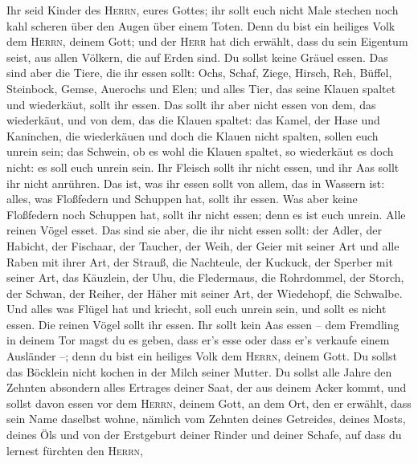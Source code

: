  Ihr seid Kinder des \textsc{Herrn}, eures Gottes; ihr
sollt euch nicht Male stechen noch kahl scheren über den Augen über
einem Toten.  Denn du bist ein heiliges Volk dem
\textsc{Herrn}, deinem Gott; und der \textsc{Herr} hat dich erwählt,
dass du sein Eigentum seist, aus allen Völkern, die auf Erden sind.
 Du sollst keine Gräuel essen.  Das sind
aber die Tiere, die ihr essen sollt: Ochs, Schaf, Ziege, 
Hirsch, Reh, Büffel, Steinbock, Gemse, Auerochs und Elen; 
und alles Tier, das seine Klauen spaltet und wiederkäut, sollt ihr
essen.  Das sollt ihr aber nicht essen von dem, das
wiederkäut, und von dem, das die Klauen spaltet: das Kamel, der Hase und
Kaninchen, die wiederkäuen und doch die Klauen nicht spalten, sollen
euch unrein sein;  das Schwein, ob es wohl die Klauen
spaltet, so wiederkäut es doch nicht: es soll euch unrein sein. Ihr
Fleisch sollt ihr nicht essen, und ihr Aas sollt ihr nicht anrühren.
 Das ist, was ihr essen sollt von allem, das in Wassern
ist: alles, was Floßfedern und Schuppen hat, sollt ihr essen.
 Was aber keine Floßfedern noch Schuppen hat, sollt ihr
nicht essen; denn es ist euch unrein.  Alle reinen Vögel
esset.  Das sind sie aber, die ihr nicht essen sollt: der
Adler, der Habicht, der Fischaar,  der Taucher, der Weih,
der Geier mit seiner Art  und alle Raben mit ihrer Art,
 der Strauß, die Nachteule, der Kuckuck, der Sperber mit
seiner Art,  das Käuzlein, der Uhu, die Fledermaus,
 die Rohrdommel, der Storch, der Schwan, 
der Reiher, der Häher mit seiner Art, der Wiedehopf, die Schwalbe.
 Und alles was Flügel hat und kriecht, soll euch unrein
sein, und sollt es nicht essen.  Die reinen Vögel sollt
ihr essen.  Ihr sollt kein Aas essen -- dem Fremdling in
deinem Tor magst du es geben, dass er's esse oder dass er's verkaufe
einem Ausländer --; denn du bist ein heiliges Volk dem \textsc{Herrn},
deinem Gott. Du sollst das Böcklein nicht kochen in der Milch seiner
Mutter.  Du sollst alle Jahre den Zehnten absondern alles
Ertrages deiner Saat, der aus deinem Acker kommt,  und
sollst davon essen vor dem \textsc{Herrn}, deinem Gott, an dem Ort, den
er erwählt, dass sein Name daselbst wohne, nämlich vom Zehnten deines
Getreides, deines Mosts, deines Öls und von der Erstgeburt deiner Rinder
und deiner Schafe, auf dass du lernest fürchten den \textsc{Herrn},
